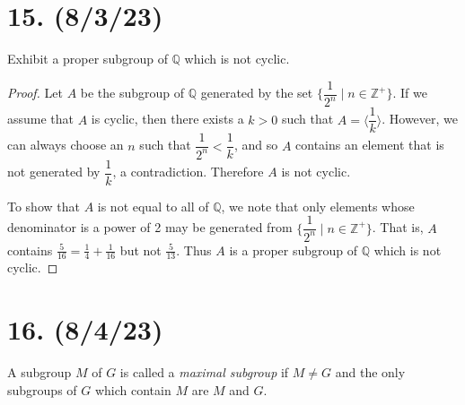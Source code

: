 \documentclass{article}
\begin{document}
\section*{15. (8/3/23)}

Exhibit a proper subgroup of $\mathbb{Q}$ which is not cyclic.

\begin{proof}
    Let $A$ be the subgroup of $\mathbb{Q}$ generated by the set $\{ \dfrac{1}{2^n} \mid n \in \mathbb{Z}^+ \}$. If we assume that $A$ is cyclic, then there exists a $k > 0$ such that $A = \langle \dfrac{1}{k} \rangle$. However, we can always choose an $n$ such that $\dfrac{1}{2^n} < \dfrac{1}{k}$, and so $A$ contains an element that is not generated by $\dfrac{1}{k}$, a contradiction. Therefore $A$ is not cyclic.

    To show that $A$ is not equal to all of $\mathbb{Q}$, we note that only elements whose denominator is a power of 2 may be generated from $\{ \dfrac{1}{2^n} \mid n \in \mathbb{Z}^+ \}$. That is, $A$ contains $\frac{5}{16} = \frac{1}{4} + \frac{1}{16}$ but not $\frac{5}{13}$. Thus $A$ is a proper subgroup of $\mathbb{Q}$ which is not cyclic.
\end{proof}

\section*{16. (8/4/23)}

A subgroup $M$ of $G$ is called a \emph{maximal subgroup} if $M \neq G$ and the only subgroups of $G$ which contain $M$ are $M$ and $G$.
\end{document}
